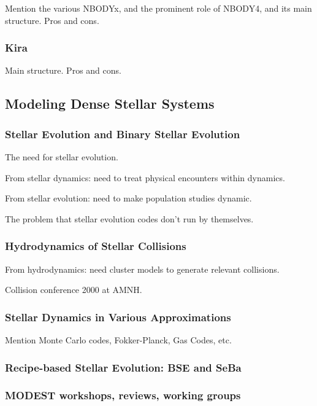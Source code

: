 \documentclass{article}[12pt]
\def\filler{xxxx xxxx xxxx xxxx xxxx xxxx xxxx xxxx xxxx xxxx xxxx xxxx
xxxx xxxx xxxx xxxx xxxx xxxx xxxx xxxx xxxx xxxx xxxx xxxx
xxxx xxxx xxxx xxxx xxxx xxxx xxxx xxxx xxxx xxxx xxxx xxxx
xxxx xxxx xxxx xxxx xxxx xxxx xxxx xxxx xxxx xxxx xxxx xxxx
xxxx xxxx xxxx xxxx xxxx xxxx xxxx xxxx xxxx xxxx xxxx xxxx
xxxx xxxx xxxx xxxx xxxx xxxx xxxx xxxx xxxx xxxx xxxx xxxx
xxxx xxxx xxxx xxxx xxxx xxxx xxxx xxxx xxxx xxxx xxxx xxxx
xxxx xxxx xxxx xxxx xxxx xxxx xxxx xxxx xxxx xxxx xxxx xxxx}
\def\filler{}
\begin{document}
Mention the various NBODYx, and the prominent role of NBODY4, and its
main structure.  Pros and cons.

\subsubsection{Kira}

Main structure.  Pros and cons.

\subsection{Modeling Dense Stellar Systems}

\filler

\subsubsection{Stellar Evolution and Binary Stellar Evolution}

The need for stellar evolution.

From stellar dynamics: need to treat physical encounters within dynamics.

From stellar evolution: need to make population studies dynamic.

The problem that stellar evolution codes don't run by themselves.

\subsubsection{Hydrodynamics of Stellar Collisions}

From hydrodynamics: need cluster models to generate relevant collisions.

Collision conference 2000 at AMNH.

\subsubsection{Stellar Dynamics in Various Approximations}

Mention Monte Carlo codes, Fokker-Planck, Gas Codes, etc.

\subsubsection{Recipe-based Stellar Evolution: BSE and SeBa}

\filler

\subsubsection{MODEST workshops, reviews, working groups}
\end{document}
